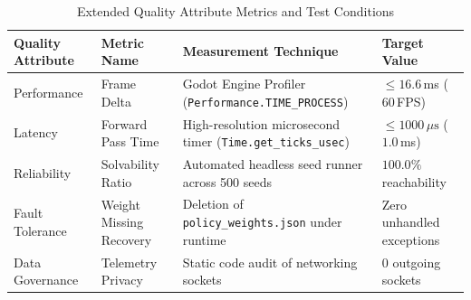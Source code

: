 \begin{table}[!htbp]
\centering
\caption{Extended Quality Attribute Metrics and Test Conditions}
\label{tab:extended_nfr}
\small
\begin{tabular}{p{}p{}p{}p{}}
\toprule
\textbf{Quality Attribute} & \textbf{Metric Name} & \textbf{Measurement Technique} & \textbf{Target Value} \\
\midrule
Performance & Frame Delta & Godot Engine Profiler (\texttt{Performance.TIME\_PROCESS}) & $\le 16.6$\,ms ($60$\,FPS) \\
Latency & Forward Pass Time & High-resolution microsecond timer (\texttt{Time.get\_ticks\_usec}) & $\le 1000\,\mu\text{s}$ ($1.0$\,ms) \\
Reliability & Solvability Ratio & Automated headless seed runner across 500 seeds & $100.0\%$ reachability \\
Fault Tolerance & Weight Missing Recovery & Deletion of \texttt{policy\_weights.json} under runtime & Zero unhandled exceptions \\
Data Governance & Telemetry Privacy & Static code audit of networking sockets & $0$ outgoing sockets \\
\bottomrule
\end{tabular}
\end{table}
